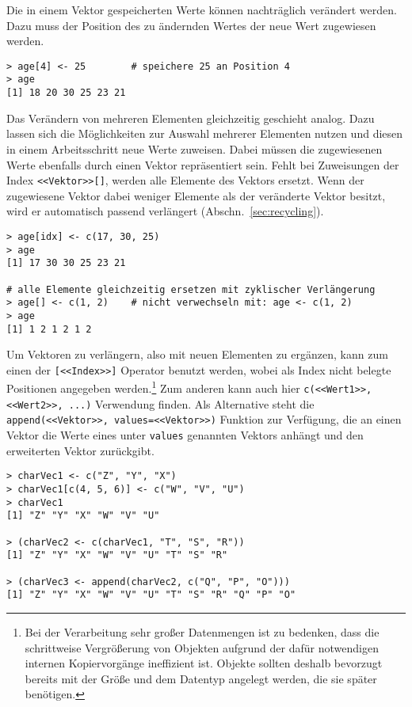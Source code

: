 Die in einem Vektor gespeicherten Werte können nachträglich verändert werden. Dazu muss der Position des zu ändernden Wertes der neue Wert zugewiesen werden.
\begin{lstlisting}
> age[4] <- 25        # speichere 25 an Position 4
> age
[1] 18 20 30 25 23 21
\end{lstlisting}

Das Verändern von mehreren Elementen gleichzeitig geschieht analog. Dazu lassen sich die Möglichkeiten zur Auswahl mehrerer Elementen nutzen und diesen in einem Arbeitsschritt neue Werte zuweisen. Dabei müssen die zugewiesenen Werte ebenfalls durch einen Vektor repräsentiert sein. Fehlt bei Zuweisungen der Index \lstinline!<<Vektor>>[]!, werden alle Elemente des Vektors ersetzt. Wenn der zugewiesene Vektor dabei weniger Elemente als der veränderte Vektor besitzt, wird er automatisch passend verlängert (Abschn.\ \ref{sec:recycling}).
\begin{lstlisting}
> age[idx] <- c(17, 30, 25)
> age
[1] 17 30 30 25 23 21

# alle Elemente gleichzeitig ersetzen mit zyklischer Verlängerung
> age[] <- c(1, 2)    # nicht verwechseln mit: age <- c(1, 2)
> age
[1] 1 2 1 2 1 2
\end{lstlisting}

Um Vektoren zu verlängern, also mit neuen Elementen zu ergänzen, kann zum einen der \lstinline![<<Index>>]! Operator benutzt werden, wobei als Index nicht belegte Positionen angegeben werden.\footnote{\label{ftn:vecAdd}Bei der Verarbeitung sehr großer Datenmengen ist zu bedenken, dass die schrittweise Vergrößerung von Objekten aufgrund der dafür notwendigen internen Kopiervorgänge ineffizient ist. Objekte sollten deshalb bevorzugt bereits mit der Größe und dem Datentyp angelegt werden, die sie später benötigen.} Zum anderen kann auch hier \lstinline!c(<<Wert1>>, <<Wert2>>, ...)! Verwendung finden. Als Alternative steht die \lstinline!append(<<Vektor>>, values=<<Vektor>>)! Funktion zur Verfügung, die an einen Vektor die Werte eines unter \lstinline!values! genannten Vektors anhängt und den erweiterten Vektor zurückgibt.
\begin{lstlisting}
> charVec1 <- c("Z", "Y", "X")
> charVec1[c(4, 5, 6)] <- c("W", "V", "U")
> charVec1
[1] "Z" "Y" "X" "W" "V" "U"

> (charVec2 <- c(charVec1, "T", "S", "R"))
[1] "Z" "Y" "X" "W" "V" "U" "T" "S" "R"

> (charVec3 <- append(charVec2, c("Q", "P", "O")))
[1] "Z" "Y" "X" "W" "V" "U" "T" "S" "R" "Q" "P" "O"
\end{lstlisting}

